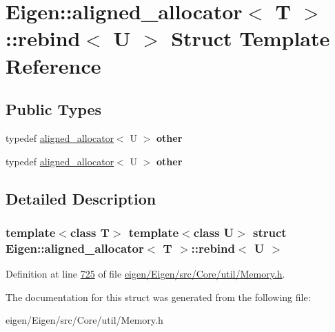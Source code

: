 \hypertarget{struct_eigen_1_1aligned__allocator_1_1rebind}{}\section{Eigen\+:\+:aligned\+\_\+allocator$<$ T $>$\+:\+:rebind$<$ U $>$ Struct Template Reference}
\label{struct_eigen_1_1aligned__allocator_1_1rebind}
\subsection*{Public Types}
\begin{DoxyCompactItemize}
\item 
\mbox{\label{struct_eigen_1_1aligned__allocator_1_1rebind_aed3b0e11c4712793af0e508d9d8f4ade}} 
typedef \hyperlink{group___core___module_class_eigen_1_1aligned__allocator}{aligned\+\_\+allocator}$<$ U $>$ {\bfseries other}
\item 
\mbox{\label{struct_eigen_1_1aligned__allocator_1_1rebind_aed3b0e11c4712793af0e508d9d8f4ade}} 
typedef \hyperlink{group___core___module_class_eigen_1_1aligned__allocator}{aligned\+\_\+allocator}$<$ U $>$ {\bfseries other}
\end{DoxyCompactItemize}


\subsection{Detailed Description}
\subsubsection*{template$<$class T$>$\newline
template$<$class U$>$\newline
struct Eigen\+::aligned\+\_\+allocator$<$ T $>$\+::rebind$<$ U $>$}



Definition at line \hyperlink{eigen_2_eigen_2src_2_core_2util_2_memory_8h_source_l00725}{725} of file \hyperlink{eigen_2_eigen_2src_2_core_2util_2_memory_8h_source}{eigen/\+Eigen/src/\+Core/util/\+Memory.\+h}.



The documentation for this struct was generated from the following file\+:\begin{DoxyCompactItemize}
\item 
eigen/\+Eigen/src/\+Core/util/\+Memory.\+h\end{DoxyCompactItemize}
